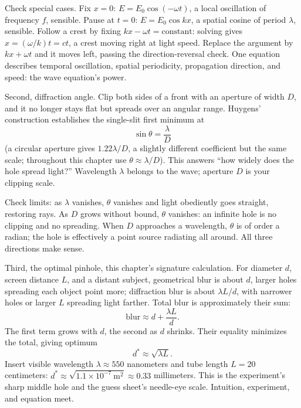 Check special cases. Fix \(x=0\): \(E=E_0\cos(-\omega t)\), a local oscillation of frequency \(f\), sensible. Pause at \(t=0\): \(E=E_0\cos kx\), a spatial cosine of period \(\lambda\), sensible. Follow a crest by fixing \(kx-\omega t=\text{constant}\): solving gives \(x=(\omega/k)t=ct\), a crest moving right at light speed. Replace the argument by \(kx+\omega t\) and it moves left, passing the direction-reversal check. One equation describes temporal oscillation, spatial periodicity, propagation direction, and speed: the wave equation's power.

Second, diffraction angle. Clip both sides of a front with an aperture of width \(D\), and it no longer stays flat but spreads over an angular range. Huygens' construction establishes the single-slit first minimum at
\[
  \sin\theta=\frac{\lambda}{D}
\]
(a circular aperture gives \(1.22\lambda/D\), a slightly different coefficient but the same scale; throughout this chapter use \(\theta\approx\lambda/D\)). This answers ``how widely does the hole spread light?'' Wavelength \(\lambda\) belongs to the wave; aperture \(D\) is your clipping scale.

\begin{center}
\end{center}

Check limits: as \(\lambda\) vanishes, \(\theta\) vanishes and light obediently goes straight, restoring rays. As \(D\) grows without bound, \(\theta\) vanishes: an infinite hole is no clipping and no spreading. When \(D\) approaches a wavelength, \(\theta\) is of order a radian; the hole is effectively a point source radiating all around. All three directions make sense.

Third, the optimal pinhole, this chapter's signature calculation. For diameter \(d\), screen distance \(L\), and a distant subject, geometrical blur is about \(d\), larger holes spreading each object point more; diffraction blur is about \(\lambda L/d\), with narrower holes or larger \(L\) spreading light farther. Total blur is approximately their sum:
\[
  \text{blur}\approx d+\frac{\lambda L}{d}.
\]
The first term grows with \(d\), the second as \(d\) shrinks. Their equality minimizes the total, giving optimum
\[
  d^{*}\approx\sqrt{\lambda L}.
\]
Insert visible wavelength \(\lambda\approx 550\) nanometers and tube length \(L=20\) centimeters: \(d^{*}\approx\sqrt{1.1\times10^{-7}\ \mathrm{m}^2}\approx 0.33\) millimeters. This is the experiment's sharp middle hole and the guess sheet's needle-eye scale. Intuition, experiment, and equation meet.

